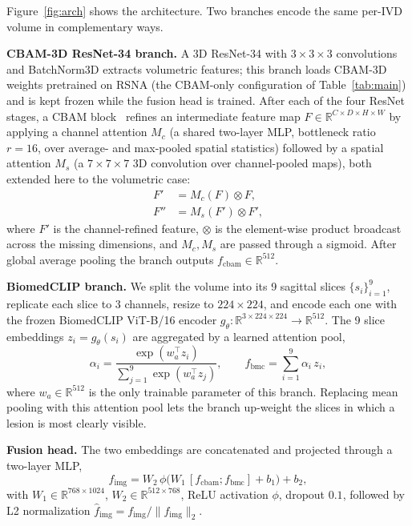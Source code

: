\documentclass[runningheads]{llncs}
\begin{document}
Figure~\ref{fig:arch} shows the architecture. Two branches encode the same per-IVD volume in complementary ways.

\textbf{CBAM-3D ResNet-34 branch.}
A 3D ResNet-34 with $3 \times 3 \times 3$ convolutions and BatchNorm3D extracts volumetric features; this branch loads CBAM-3D weights pretrained on RSNA (the CBAM-only configuration of Table~\ref{tab:main}) and is kept frozen while the fusion head is trained. After each of the four ResNet stages, a CBAM block~\cite{woo2018cbam} refines an intermediate feature map $F \in \mathbb{R}^{C \times D \times H \times W}$ by applying a channel attention $M_c$ (a shared two-layer MLP, bottleneck ratio $r=16$, over average- and max-pooled spatial statistics) followed by a spatial attention $M_s$ (a $7\!\times\!7\!\times\!7$ 3D convolution over channel-pooled maps), both extended here to the volumetric case:
\begin{align}
F' &= M_c(F) \otimes F, \label{eq:cbam_c}\\
F'' &= M_s(F') \otimes F', \label{eq:cbam_s}
\end{align}
where $F'$ is the channel-refined feature, $\otimes$ is the element-wise product broadcast across the missing dimensions, and $M_c, M_s$ are passed through a sigmoid. After global average pooling the branch outputs $f_{\text{cbam}} \in \mathbb{R}^{512}$.

\textbf{BiomedCLIP branch.}
We split the volume into its 9 sagittal slices $\{s_i\}_{i=1}^{9}$, replicate each slice to 3 channels, resize to $224 \times 224$, and encode each one with the frozen BiomedCLIP ViT-B/16 encoder $g_\theta : \mathbb{R}^{3 \times 224 \times 224} \to \mathbb{R}^{512}$. The 9 slice embeddings $z_i = g_\theta(s_i)$ are aggregated by a learned attention pool,
\begin{equation}
\alpha_i = \frac{\exp(w_a^\top z_i)}{\sum_{j=1}^{9} \exp(w_a^\top z_j)},
\qquad
f_{\text{bmc}} = \sum_{i=1}^{9} \alpha_i \, z_i,
\label{eq:slicepool}
\end{equation}
where $w_a \in \mathbb{R}^{512}$ is the only trainable parameter of this branch. Replacing mean pooling with this attention pool lets the branch up-weight the slices in which a lesion is most clearly visible.

\textbf{Fusion head.}
The two embeddings are concatenated and projected through a two-layer MLP,
\begin{equation}
f_{\text{img}} = W_2\,\phi\!\big(W_1\,[f_{\text{cbam}};f_{\text{bmc}}] + b_1\big) + b_2,
\label{eq:fusion}
\end{equation}
with $W_1 \in \mathbb{R}^{768 \times 1024}$, $W_2 \in \mathbb{R}^{512 \times 768}$, ReLU activation $\phi$, dropout $0.1$, followed by L2 normalization $\hat{f}_{\text{img}} = f_{\text{img}} / \|f_{\text{img}}\|_2$.
\end{document}

